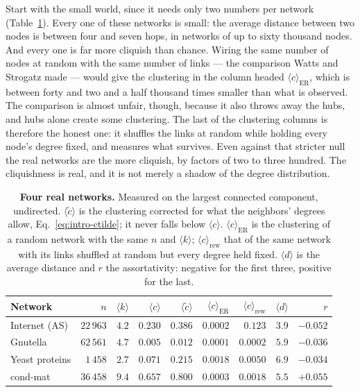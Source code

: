 Start with the small world, since it needs only two numbers per network
(Table~\ref{tab:intro-data}). Every one of these networks is small: the average
distance between two nodes is between four and seven hops, in networks of up to
sixty thousand nodes. And every one is far more cliquish than chance. Wiring the
same number of nodes at random with the same number of links --- the comparison
Watts and Strogatz made --- would give the clustering in the column headed
$\langle c\rangle_{\mathrm{ER}}$, which is between forty and two and a half
thousand times smaller than what is observed. The comparison is almost unfair,
though, because it also throws away the hubs, and hubs alone create some
clustering. The last of the clustering columns is therefore the honest one: it
shuffles the links at random while holding every node's degree fixed, and measures
what survives. Even against that stricter null the real networks are the more
cliquish, by factors of two to three hundred. The cliquishness is real, and it is
not merely a shadow of the degree distribution.

\begin{table}[t]
\centering
\footnotesize
\setlength{\tabcolsep}{3.2pt}
\caption{\textbf{Four real networks.} Measured on the largest connected component,
undirected. $\langle\tilde{c}\rangle$ is the clustering corrected for what the
neighbors' degrees allow, Eq.~\eqref{eq:intro-ctilde}; it never falls below
$\langle c\rangle$. $\langle c\rangle_{\mathrm{ER}}$ is the clustering of a random
network with the same $n$ and $\langle k\rangle$; $\langle c\rangle_{\mathrm{rew}}$
that of the same network with its links shuffled at random but every degree held
fixed. $\langle d\rangle$ is the average distance and $r$ the assortativity:
negative for the first three, positive for the last.}
\label{tab:intro-data}
\begin{tabular}{lrrrrrrrr}
\hline
Network & $n$ & $\langle k\rangle$ & $\langle c\rangle$ &
$\langle \tilde{c}\rangle$ &
$\langle c\rangle_{\mathrm{ER}}$ & $\langle c\rangle_{\mathrm{rew}}$ &
$\langle d\rangle$ & $r$ \\
\hline
Internet (AS)  & $22\,963$ & $4.2$ & $0.230$ & $0.386$ & $0.0002$ & $0.123$  & $3.9$ & $-0.052$ \\
Gnutella       & $62\,561$ & $4.7$ & $0.005$ & $0.012$ & $0.0001$ & $0.0002$ & $5.9$ & $-0.036$ \\
Yeast proteins & $1\,458$  & $2.7$ & $0.071$ & $0.215$ & $0.0018$ & $0.0050$ & $6.9$ & $-0.034$ \\
cond-mat       & $36\,458$ & $9.4$ & $0.657$ & $0.800$ & $0.0003$ & $0.0018$ & $5.5$ & $+0.055$ \\
\hline
\end{tabular}
\end{table}

